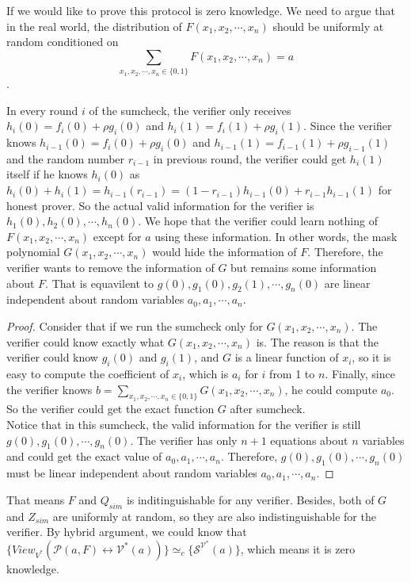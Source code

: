 If we would like to prove this protocol is zero knowledge. We need to argue that in the real world, the distribution of $F(x_1, x_2, \cdots, x_n)$ should be uniformly at random conditioned on
$$\sum\limits_{x_1, x_2, \cdots, x_n \in \{0, 1\}}F(x_1, x_2, \cdots, x_n) = a$$.

In every round $i$ of the sumcheck, the verifier only receives $h_i(0) = f_i(0) + \rho g_i(0)$ and $h_i(1) = f_i(1) + \rho g_i(1)$. Since the verifier knows $h_{i-1}(0) = f_i(0) + \rho g_i(0)$ and $h_{i-1}(1) = f_{i-1}(1) + \rho g_{i-1}(1)$ and the random number $r_{i-1}$ in previous round, the verifier could get $h_{i}(1)$ itself if he knows $h_{i}(0)$ as $h_{i}(0) + h_{i}(1) = h_{i-1}(r_{i-1}) = (1 - r_{i-1})h_{i-1}(0) + r_{i-1}h_{i-1}(1)$ for honest prover. So the actual valid information for the verifier is $h_{1}(0), h_{2}(0), \cdots, h_{n}(0)$. We hope that the verifier could learn nothing of $F(x_1, x_2, \cdots, x_n)$ except for $a$ using these information. In other words, the mask polynomial $G(x_1, x_2, \cdots, x_n)$ would hide the information of $F$. Therefore, the verifier wants to remove the information of $G$ but remains some information about $F$. That is equavilent to $g(0), g_{1}(0), g_{2}(1), \cdots, g_{n}(0)$ are linear independent about random variables $a_0, a_1, \cdots, a_n$.

\begin{proof}
Consider that if we run the sumcheck only for $G(x_1, x_2, \cdots, x_n)$. The verifier could know exactly what $G(x_1, x_2, \cdots, x_n)$ is. The reason is that the verifier could know $g_{i}(0)$ and $g_{i}(1)$, and $G$ is a linear function of $x_i$, so it is easy to compute the coefficient of $x_i$, which is $a_i$ for $i$ from 1 to $n$. Finally, since the verifier knows $b = \sum\limits_{x_1, x_2, \cdots, x_n \in \{0, 1\}}G(x_1, x_2, \cdots, x_n)$, he could compute $a_0$. So the verifier could get the exact function $G$ after sumcheck.\\  

Notice that in this sumcheck, the valid information for the verifier is still $g(0), g_{1}(0), \cdots, g_{n}(0)$. The verifier has only $n + 1$ equations about $n$ variables and could get the exact value of $a_0, a_1, \cdots, a_n$. Therefore, $g(0), g_{1}(0), \cdots, g_{n}(0)$ must be linear independent about random variables $a_0, a_1, \cdots, a_n$.
\end{proof}

That means $F$ and $Q_{sim}$ is inditinguishable for any verifier. Besides, both of $G$ and $Z_{sim}$ are uniformly at random, so they are also indistinguishable for the verifier. By hybrid argument, we could know that $\{View_{V^*}(\mathcal{P}(a, F) \leftrightarrow \mathcal{V^*}(a))\} \simeq_{c} \{\mathcal{S}^{\mathcal{V^*}}(a)\}$, which means it is zero knowledge.\\

